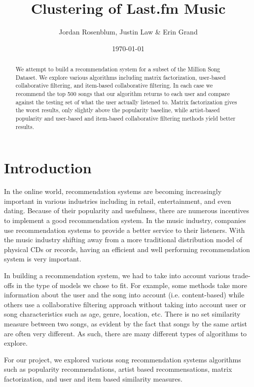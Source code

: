 \documentclass[12pt,preprint]{aastex}
\begin{document}
\title{Clustering of Last.fm Music}

 \author{Jordan Rosenblum, Justin Law \& Erin Grand}
 
\date{\today}             

\begin{abstract}
We attempt to build a recommendation system for a subset of the Million Song Dataset. We explore various algorithms including matrix factorization, user-based collaborative filtering, and item-based collaborative filtering. In each case we recommend the top 500 songs that our algorithm returns to each user and compare against the testing set of what the user actually listened to. Matrix factorization gives the worst results, only slightly above the popularity baseline, while artist-based popularity and user-based and item-based collaborative filtering methods yield better results.
\end{abstract}

\tableofcontents

\section{Introduction}
In the online world, recommendation systems are becoming increasingly important in various industries including in retail, entertainment, and even dating. 
Because of their popularity and usefulness, there are numerous incentives to implement a good recommendation system. 
In the music industry, companies use recommendation systems to provide a better service to their listeners. 
With the music industry shifting away from a more traditional distribution model of physical CDs or records, 
having an efficient and well performing recommendation system is very important. 

In building a recommendation system, we had to take into account various trade-offs in the type of models we chose to fit. For example, some methods take more information about the user and the song into account (i.e. content-based) while others use a collaborative filtering approach without taking into account user or song characteristics such as age, genre, location, etc.
There is no set similarity measure between two songs, as evident by the fact that songs by the same artist are often very different. As such, there are many different types of algorithms to explore. 

For our project, we explored various song recommendation systems algorithms such as popularity recommendations, artist based recommensations, matrix factorization, and user and item based similarity measures.  
\end{document}
